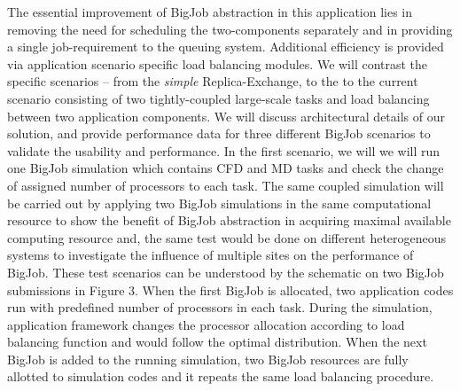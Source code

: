 \documentclass[a4paper]{article}
\begin{document}
The essential improvement of BigJob abstraction in this application lies in removing the need for scheduling the two-components separately and in providing a single job-requirement to the queuing system. Additional efficiency is provided via application scenario specific load balancing modules.  We will contrast the specific scenarios -- from the {\it simple} Replica-Exchange, to the %
to the current scenario consisting of two tightly-coupled large-scale tasks and load balancing between two application components. %
We will discuss architectural details of our solution, and provide performance data for three different BigJob scenarios to validate the usability and performance. In the first scenario, we will we will run one BigJob simulation which contains CFD and MD tasks and check the change of assigned number of processors to each task.  The same coupled simulation will be carried out by applying two BigJob simulations in the same computational resource to show the benefit of BigJob abstraction in acquiring maximal available computing resource and, the same test would be done on different heterogeneous systems to investigate the influence of multiple sites on the performance of BigJob. These test scenarios can be understood by the schematic on two BigJob submissions in Figure 3. When the first BigJob is allocated, two application codes run with predefined number of processors in each task. During the simulation, application framework changes the processor allocation according to load balancing function and would follow the optimal distribution. When the next BigJob is added to the running simulation, two BigJob resources are fully allotted to simulation codes and it repeats the same load balancing procedure.

\vspace{4pt}
\end{document}
